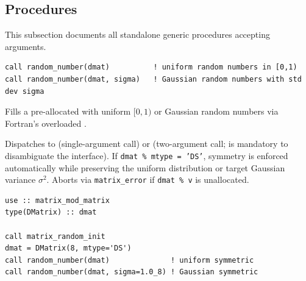 \subsection{Procedures}
\label{subsec:dmat_procs}

This subsection documents all standalone generic procedures accepting  arguments.



\lstset{language=[95]Fortran}
\begin{lstlisting}
call random_number(dmat)          ! uniform random numbers in [0,1)
call random_number(dmat, sigma)   ! Gaussian random numbers with std dev sigma
\end{lstlisting}

Fills a pre-allocated  with uniform $[0,1)$ or Gaussian random numbers via Fortran's overloaded .

Dispatches to  (single-argument call) or  (two-argument call;  is mandatory to disambiguate the interface). If \texttt{dmat \% mtype = 'DS'}, symmetry is enforced automatically while preserving the uniform distribution or target Gaussian variance $\sigma^2$. Aborts via \texttt{matrix\_error} if \texttt{dmat \% v} is unallocated.

\begin{description}[leftmargin=2.2cm, style=nextline]
\end{description}

\lstset{language=[95]Fortran}
\begin{lstlisting}
use :: matrix_mod_matrix
type(DMatrix) :: dmat

call matrix_random_init
dmat = DMatrix(8, mtype='DS')
call random_number(dmat)              ! uniform symmetric
call random_number(dmat, sigma=1.0_8) ! Gaussian symmetric
\end{lstlisting}


